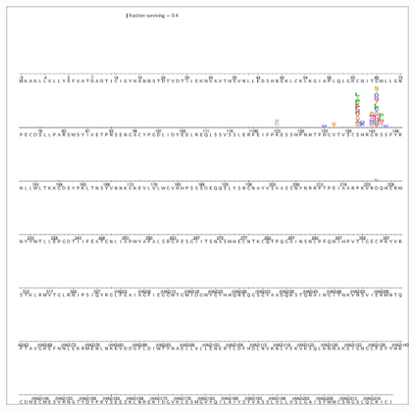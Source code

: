 \documentclass[11pt]{article}
\begin{document}
\begin{suppfigure}
\centerline{\includegraphics[trim=0.1cm 0.02cm 0.1cm 0.03cm,clip=true,width=\textwidth]{figs/logoplots/H17L19_fracsurvive.pdf}}
\caption{\label{suppfig:H17L19logo}
{\bf The excess fraction surviving selection with antibody H17L19 for all amino-acid mutations.}
The excess fraction surviving for each replicate was computed using Equation~\ref{eq:fracsurvive_excess}, then we took the median across all technical and biological replicates for each antibody concentration, and then took the medians of those values across concentrations.
The height of each letter is proportional to the excess fraction surviving of virions with that mutation.
The scale bar at the top of the plot relates the letter heights to the actual fractions.
The sites are labeled using H3 numbering.
}
\end{suppfigure}
\end{document}
